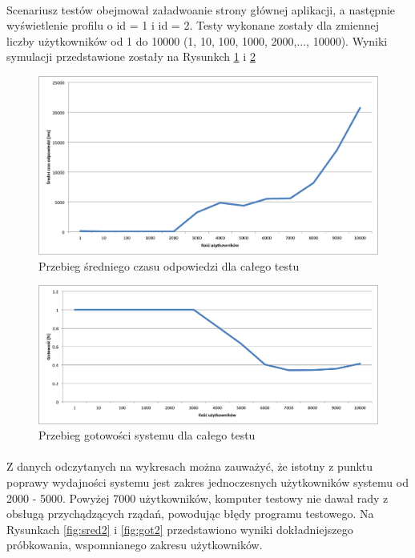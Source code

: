  \paragraph{} %
 \label{par:}
 Scenariusz testów obejmował załadwoanie strony głównej aplikacji, a następnie wyświetlenie profilu o id = 1 i id = 2. Testy wykonane zostały dla zmiennej liczby użytkowników od 1 do 10000 (1, 10, 100, 1000, 2000,..., 10000). Wyniki symulacji przedstawione zostały na Rysunkch \ref{fig:sred1} i \ref{fig:got1}

\begin{figure}[ht]
	\centering
		\includegraphics[width=1\linewidth]{assets/sredni1.png}
		\caption{Przebieg średniego czasu odpowiedzi dla całego testu}
	\label{fig:sred1}
\end{figure}

\begin{figure}[ht]
	\centering
		\includegraphics[width=1\linewidth]{assets/gotowosc1.png}
		\caption{Przebieg gotowości systemu dla całego testu}
	\label{fig:got1}
\end{figure}

\paragraph{} %
\label{par:}
Z danych odczytanych na wykresach można zauważyć, że istotny z punktu poprawy wydajności systemu jest zakres jednoczesnych użytkowników systemu od 2000 - 5000. Powyżej 7000 użytkowników, komputer testowy nie dawał rady z obsługą przychądzących rządań, powodując błędy programu testowego. Na Rysunkach \ref{fig:sred2} i \ref{fig:got2} przedstawiono wyniki dokładniejszego próbkowania, wspomnianego zakresu użytkowników.

